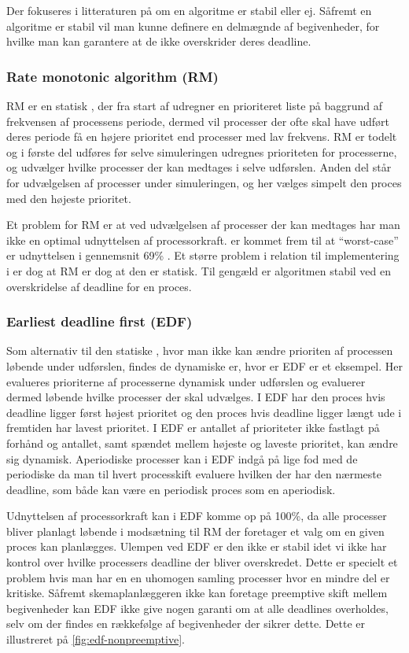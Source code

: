 Der fokuseres i litteraturen på om en algoritme er stabil eller ej. Såfremt en algoritme er stabil vil man kunne definere en delmægnde af begivenheder, for hvilke man kan garantere at de ikke overskrider deres deadline. 

\subsubsection{Rate monotonic algorithm (RM)}
RM er en statisk \sched, der fra start af udregner en prioriteret liste på baggrund af frekvensen af processens periode, dermed vil processer der ofte skal have udført deres periode få en højere prioritet end processer med lav frekvens. RM er todelt og i første del udføres før selve simuleringen udregnes  prioriteten for processerne, og udvælger hvilke processer der kan medtages i selve udførslen. Anden del står for udvælgelsen af processer  under simuleringen, og her vælges simpelt den proces med den højeste prioritet. 

Et problem for RM er at ved udvælgelsen af processer der kan medtages har man ikke en optimal udnyttelsen af processorkraft.  er kommet frem til at ``worst-case'' er udnyttelsen i gennemsnit 69\% \cite{lehoczky1989rate}. Et større problem i relation til implementering i \pycsp er dog at RM er dog at den er statisk. Til gengæld er algoritmen stabil ved en overskridelse af deadline for en proces. 

\subsubsection{Earliest deadline first (EDF)}
Som alternativ til den statiske \sched, hvor man ikke kan ændre prioriten af processen løbende under udførslen, findes de dynamiske \sched er, hvor er EDF er et eksempel. Her evalueres prioriterne af processerne dynamisk under udførslen og evaluerer dermed løbende hvilke processer der skal udvælges. I EDF har den proces hvis deadline ligger først højest prioritet og den proces hvis deadline ligger længt ude i fremtiden har lavest prioritet. I EDF er antallet af prioriteter ikke fastlagt på forhånd og antallet, samt spændet mellem højeste og laveste prioritet, kan ændre sig dynamisk. Aperiodiske processer kan i EDF indgå på lige fod med de periodiske da man til hvert processkift evaluere hvilken der har den nærmeste deadline, som både kan være en periodisk proces som en aperiodisk.

Udnyttelsen af processorkraft kan i EDF komme op på 100\%, da alle processer bliver planlagt løbende i modsætning til RM der foretager et valg om en given proces kan planlægges.  Ulempen ved EDF er den ikke er stabil idet vi ikke har kontrol over hvilke processers deadline der bliver overskredet. Dette er specielt et problem hvis man har en en uhomogen samling processer hvor en mindre del er kritiske. Såfremt skemaplanlæggeren ikke kan foretage preemptive skift mellem begivenheder kan EDF ikke give nogen garanti om at alle deadlines overholdes, selv om der findes en rækkefølge af begivenheder der sikrer dette. Dette er illustreret på \cref{fig:edf-nonpreemptive}.

